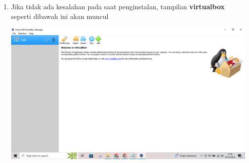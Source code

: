 \documentclass{article}
\begin{document}
\begin{flushleft}
\begin{enumerate}
			\item Jika tidak ada kesalahan pada saat penginstalan, tampilan \textbf{virtualbox} seperti dibawah ini akan muncul
        		
        		\includegraphics[scale=0.2]{vbox}        	
        \end{enumerate}

    \end{flushleft}
\end{document}
